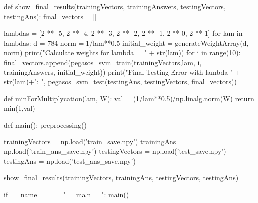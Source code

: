 \documentclass[a4paper,12pt]{article}
\begin{document}
\begin{python}
def show_final_results(trainingVectors, trainingAnswers, testingVectors, testingAns):
    final_vectors = []

    lambdas = [2 ** -5, 2 ** -4, 2 ** -3, 2 ** -2, 2 ** -1, 2 ** 0, 2 ** 1]
    for lam in lambdas:
        d = 784
        norm = 1/lam**0.5
        initial_weight = generateWeightArray(d, norm)
        print("Calculate weights for lambda = " + str(lam))
        for i in range(10):
            final_vectors.append(pegasos_svm_train(trainingVectors,lam, i, trainingAnswers, initial_weight))
        print("Final Testing Error with lambda " + str(lam)+": ", pegasos_svm_test(testingAns, testingVectors, final_vectors))

def minForMultiplycation(lam, W):
    val = (1/lam**0.5)/np.linalg.norm(W)
    return min(1,val)

def main():
    preprocessing()

    trainingVectors = np.load('train_save.npy')
    trainingAns = np.load('train_ans_save.npy')
    testingVectors = np.load('test_save.npy')
    testingAns = np.load('test_ans_save.npy')

    show_final_results(trainingVectors, trainingAns, testingVectors, testingAns)


if __name__ == "__main__":
    main()

\end{python}
\end{document}
